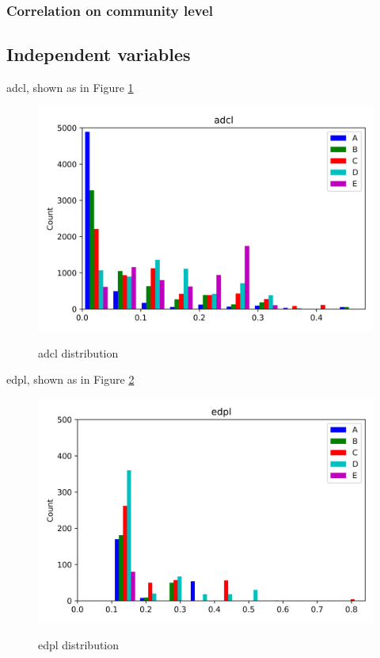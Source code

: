 \documentclass{article}
\begin{document}
\subsubsection{Correlation on community level}

\subsection{Independent variables}

adcl, shown as in Figure \ref{adcl}
\begin{figure}[htbp]
	\centering
	\includegraphics[width=\textwidth, keepaspectratio]{adcl.png}\\
	\caption{adcl distribution}
	\label{adcl}
\end{figure}



edpl, shown as in Figure \ref{edpl}
\begin{figure}[htbp]
	\centering
	\includegraphics[width=\textwidth, keepaspectratio]{edpl.png}\\
	\caption{edpl distribution}
	\label{edpl}
\end{figure}
\end{document}
